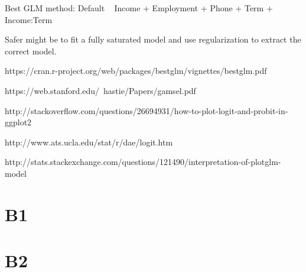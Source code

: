 Best GLM method:
Default ~ Income + Employment + Phone + Term + Income:Term

Safer might be to fit a fully saturated model and use regularization to extract the correct model. 


https://cran.r-project.org/web/packages/bestglm/vignettes/bestglm.pdf

https://web.stanford.edu/~hastie/Papers/gamsel.pdf

http://stackoverflow.com/questions/26694931/how-to-plot-logit-and-probit-in-ggplot2

http://www.ats.ucla.edu/stat/r/dae/logit.htm

http://stats.stackexchange.com/questions/121490/interpretation-of-plotglm-model


\section{B1}


\section{B2}


